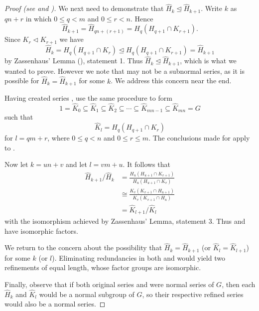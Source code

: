 \begin{proof}[Proof (see {\cite[\S 72]{clark_1984}} and \cite{proofwiki_schreier-zassenhaus})]
    We next need to demonstrate that $\hat{H}_k \unlhd \hat{H}_{k+1}$. Write $k$ as $qn+r$ in which $0 \leq q < m$ and $0 \leq r < n$. Hence
    \[
        \hat{H}_{k+1} = \hat{H}_{qn+(r+1)} = H_q(H_{q+1}\cap K_{r+1}).
    \]
    Since $K_r \lhd K_{r+1}$ we have
    \[
        \hat{H}_k = H_q(H_{q+1}\cap K_r) \unlhd H_q(H_{q+1}\cap K_{r+1}) = \hat{H}_{k+1}
    \]
    by Zassenhaus' Lemma (), statement 1. Thus $\hat{H}_k \unlhd \hat{H}_{k+1}$, which is what we wanted to prove. However we note that  may not be a subnormal series, as it is possible for $\hat{H}_k = \hat{H}_{k+1}$ for some $k$. We address this concern near the end.

    Having created series , use the same procedure to form
    \begin{equation}\label{eqn:thrm-schreier-eqn-b-prime}
        1 = \hat{K}_0 \subseteq \hat{K}_1 \subseteq \hat{K}_2 \subseteq \cdots \subseteq \hat{K}_{mn - 1} \subseteq \hat{K}_{mn} = G
        \tag{B'}
    \end{equation}
    such that
    \[
        \hat{K}_l = H_q(H_{q+1}\cap K_r)
    \]
    for $l = qm + r$, where $0 \leq q < n$ and $0 \leq r \leq m$. The conclusions made for  apply to .

    Now let $k = un + v$ and let $l = vm + u$. It follows that
    \begin{align*}
        \hat{H}_{k+1}/\hat{H}_k &= \frac{H_u(H_{u+1}\cap K_{v+1})}{H_u(H_{u+1}\cap K_v)}\\
        &\cong \frac{K_v(K_{v+1}\cap H_{u+1})}{K_v(K_{v+1}\cap H_u)}\\
        &= \hat{K}_{l+1}/\hat{K}_l
    \end{align*}
    with the isomorphism achieved by Zassenhaus' Lemma, statement 3. Thus  and  have isomorphic factors.

    We return to the concern about the possibility that $\hat{H}_k = \hat{H}_{k+1}$ (or $\hat{K}_l = \hat{K}_{l+1}$) for some $k$ (or $l$). Eliminating redundancies in both  and  would yield two refinements of equal length, whose factor groups are isomorphic.

    Finally, observe that if both original series  and  were normal series of $G$, then each $\hat{H}_k$ and $\hat{K}_l$ would be a normal subgroup of $G$, so their respective refined series would also be a normal series.
\end{proof}

